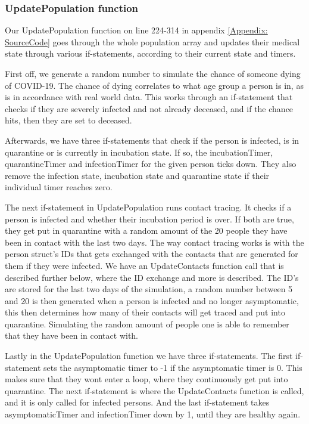 \subsubsection{UpdatePopulation function}
Our UpdatePopulation function on line 224-314 in appendix \vref{Appendix: SourceCode} goes through the whole population array and updates their medical state through various if-statements, according to their current state and timers. 

First off, we generate a random number to simulate the chance of someone dying of COVID-19. The chance of dying correlates to what age group a person is in, as is in accordance with real world data. This works through an if-statement that checks if they are severely infected and not already deceased, and if the chance hits, then they are set to deceased.

Afterwards, we have three if-statements that check if the person is infected, is in quarantine or is currently in incubation state. If so, the incubationTimer, quarantineTimer and infectionTimer for the given person ticks down. They also remove the infection state, incubation state and quarantine state if their individual timer reaches zero.

The next if-statement in UpdatePopulation runs contact tracing. It checks if a person is infected and whether their incubation period is over. If both are true, they get put in quarantine with a random amount of the 20 people they have been in contact with the last two days. The way contact tracing works is with the person struct's IDs that gets exchanged with the contacts that are generated for them if they were infected. We have an UpdateContacts function call that is described further below, where the ID exchange and more is described.
The ID's are stored for the last two days of the simulation, a random number between 5 and 20 is then generated when a person is infected and no longer asymptomatic, this then determines how many of their contacts will get traced and put into quarantine. Simulating the random amount of people one is able to remember that they have been in contact with.

Lastly in the UpdatePopulation function we have three if-statements. The first if-statement sets the asymptomatic timer to -1 if the asymptomatic timer is 0. This makes sure that they wont enter a loop, where they continuously get put into quarantine.
The next if-statement is where the UpdateContacts function is called, and it is only called for infected persons.
And the last if-statement takes asymptomaticTimer and infectionTimer down by 1, until they are healthy again.

